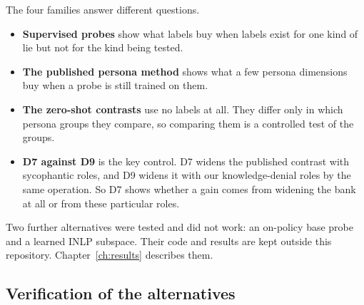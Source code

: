The four families answer different questions.
\begin{itemize}
\item \textbf{Supervised probes} show what labels buy when labels exist for one kind of lie but not for the kind being tested.
\item \textbf{The published persona method} shows what a few persona dimensions buy when a probe is still trained on them.
\item \textbf{The zero-shot contrasts} use no labels at all. They differ only in which persona groups they compare, so comparing them is a controlled test of the groups.
\item \textbf{D7 against D9} is the key control. D7 widens the published contrast with sycophantic roles, and D9 widens it with our knowledge-denial roles by the same operation. So D7 shows whether a gain comes from widening the bank at all or from these particular roles.
\end{itemize}
Two further alternatives were tested and did not work: an on-policy base probe and a learned INLP subspace. Their code and results are kept outside this repository. Chapter~\ref{ch:results} describes them. %

\subsection{Verification of the alternatives}
\label{sec:m-verification}

